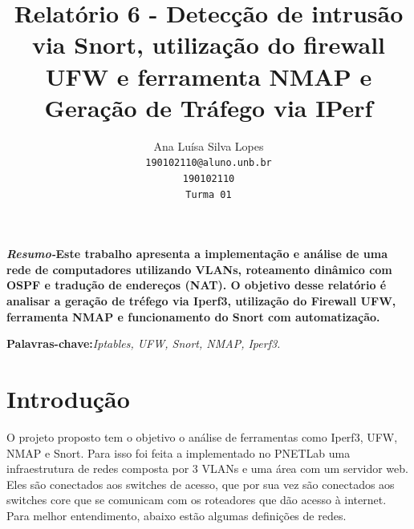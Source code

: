 \documentclass[10pt,twocolumn,letterpaper]{IEEEtran}
\begin{document}
\title{Relatório 6 - Detecção de intrusão via Snort, utilização do firewall UFW e ferramenta NMAP e Geração de Tráfego via IPerf }

\author{Ana Luísa Silva Lopes\\
{\tt\small 190102110@aluno.unb.br}\\
{\tt\small 190102110}\\
{\tt\small Turma 01}
}

\maketitle

\noindent\textbf{\textit{Resumo-}}\textbf{Este trabalho apresenta a implementação e análise de uma rede de computadores utilizando VLANs, 
roteamento dinâmico com OSPF e tradução de endereços (NAT). O objetivo desse relatório é analisar a geração de tréfego via Iperf3, utilização do Firewall UFW, ferramenta NMAP e 
funcionamento do Snort com automatização.
}

\vspace{0.5cm}

\noindent\textbf{Palavras-chave:}\textit{Iptables, UFW, Snort, NMAP, Iperf3.}


\section{Introdução}

O projeto proposto tem o objetivo o análise de ferramentas como Iperf3, UFW, NMAP e Snort. Para isso foi feita a implementado
 no PNETLab uma infraestrutura de redes composta por 3 VLANs e uma área com um servidor web. 
Eles são conectados aos switches de acesso, que por sua vez são conectados aos switches core que se comunicam com os roteadores que 
dão acesso à internet. Para melhor entendimento, abaixo estão algumas definições de redes.








\end{document}

